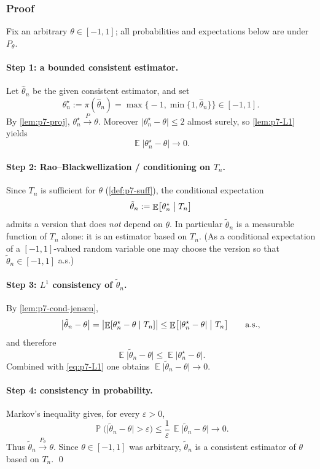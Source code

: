 \documentclass[11pt,a4paper]{article}
\DeclareMathOperator{\E}{\mathbb{E}}
\DeclareMathOperator{\Pbb}{\mathbb{P}}
\begin{document}
\subsubsection{Proof}

Fix an arbitrary \(\theta\in[-1,1]\); all probabilities and expectations below are under \(P_\theta\).

\paragraph{Step 1: a bounded consistent estimator.}
Let \(\hat\theta_n\) be the given consistent estimator, and set
\[
\theta_n^\star
:=
\pi(\hat\theta_n)
=
\max\bigl\{-1,\min\{1,\hat\theta_n\}\bigr\}
\in[-1,1].
\]
By \cref{lem:p7-proj}, \(\theta_n^\star\xrightarrow{P}\theta\). Moreover \(\lvert\theta_n^\star-\theta\rvert\le 2\) almost surely, so \cref{lem:p7-L1} yields
\begin{equation}
\label{eq:p7-L1}
\E\lvert\theta_n^\star-\theta\rvert\to 0.
\end{equation}

\paragraph{Step 2: Rao--Blackwellization / conditioning on \(T_n\).}
Since \(T_n\) is sufficient for \(\theta\) (\cref{def:p7-suff}), the conditional expectation
\[
\tilde\theta_n
:=
\E\bigl[\theta_n^\star\bigm|T_n\bigr]
\]
admits a version that does \emph{not} depend on \(\theta\). In particular \(\tilde\theta_n\) is a measurable function of \(T_n\) alone: it is an estimator based on \(T_n\). (As a conditional expectation of a \([-1,1]\)-valued random variable one may choose the version so that \(\tilde\theta_n\in[-1,1]\) a.s.)

\paragraph{Step 3: \(L^1\) consistency of \(\tilde\theta_n\).}
By \cref{lem:p7-cond-jensen},
\[
\bigl\lvert\tilde\theta_n-\theta\bigr\rvert
=
\bigl\lvert\E[\theta_n^\star-\theta\mid T_n]\bigr\rvert
\le
\E\bigl[\lvert\theta_n^\star-\theta\rvert\bigm|T_n\bigr]
\qquad\text{a.s.},
\]
and therefore
\[
\E\lvert\tilde\theta_n-\theta\rvert
\le
\E\lvert\theta_n^\star-\theta\rvert.
\]
Combined with \eqref{eq:p7-L1} one obtains \(\E\lvert\tilde\theta_n-\theta\rvert\to 0\).

\paragraph{Step 4: consistency in probability.}
Markov's inequality gives, for every \(\varepsilon>0\),
\[
\Pbb\bigl(\lvert\tilde\theta_n-\theta\rvert>\varepsilon\bigr)
\le
\frac{1}{\varepsilon}\,\E\lvert\tilde\theta_n-\theta\rvert
\to 0.
\]
Thus \(\tilde\theta_n\xrightarrow{P_\theta}\theta\). Since \(\theta\in[-1,1]\) was arbitrary, \(\tilde\theta_n\) is a consistent estimator of \(\theta\) based on \(T_n\).
\qed
\end{document}
